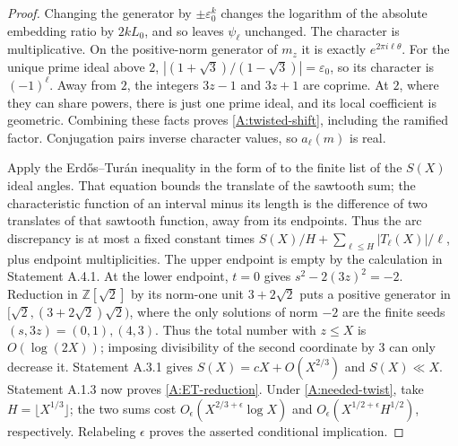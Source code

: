 \begin{proof}
Changing the generator by $\pm\varepsilon_0^k$ changes the logarithm
of the absolute embedding ratio by $2kL_0$, and so leaves
$\psi_\ell$ unchanged. The character is multiplicative. On the
positive-norm generator of $m_z$ it is exactly
$e^{2\pi i\ell\theta}$. For the unique prime ideal above $2$,
$|(1+\sqrt3)/(1-\sqrt3)|=\varepsilon_0$, so its character is
$(-1)^\ell$. Away from $2$, the integers $3z-1$ and $3z+1$ are
coprime. At $2$, where they can share powers, there is just one prime
ideal, and its local coefficient is geometric. Combining these facts
proves \eqref{A:twisted-shift}, including the ramified factor.
Conjugation pairs inverse character values, so $a_\ell(m)$ is real.

Apply the Erd\H{o}s--Tur\'an inequality in the form of
\cite[equation (8.2)]{CarneiroVaaler2010} to the finite list of the
$S(X)$ ideal angles. That equation bounds the translate of the sawtooth
sum; the characteristic function of an interval minus its length is
the difference of two translates of that sawtooth function, away from
its endpoints. Thus the arc discrepancy is at most a fixed constant
times $S(X)/H+\sum_{\ell\leq H}|T_\ell(X)|/\ell$, plus endpoint
multiplicities. The upper endpoint is empty by the calculation in
Statement A.4.1. At the lower endpoint, $t=0$ gives
$s^2-2(3z)^2=-2$. Reduction in $\mathbb Z[\sqrt2]$ by its norm-one
unit $3+2\sqrt2$ puts a positive generator in
$[\sqrt2,(3+2\sqrt2)\sqrt2)$, where the only solutions of norm $-2$
are the finite seeds $(s,3z)=(0,1),(4,3)$. Thus the total number with
$z\leq X$ is $O(\log(2X))$; imposing divisibility of the second
coordinate by $3$ can only decrease it.
Statement A.3.1 gives $S(X)=cX+O(X^{2/3})$ and $S(X)\ll X$.
Statement A.1.3 now proves \eqref{A:ET-reduction}.
Under \eqref{A:needed-twist}, take $H=\lfloor X^{1/3}\rfloor$;
the two sums cost $O_\epsilon(X^{2/3+\epsilon}\log X)$ and
$O_\epsilon(X^{1/2+\epsilon}H^{1/2})$, respectively. Relabeling
$\epsilon$ proves the asserted conditional implication.
\end{proof}

